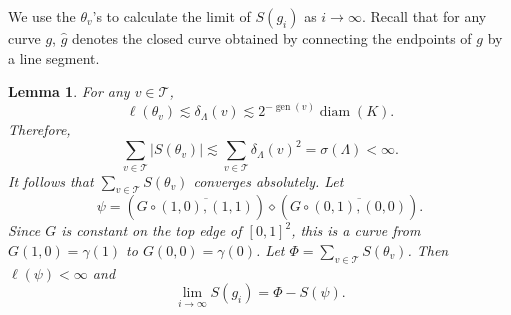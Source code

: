 \documentclass[12pt,reqno]{amsart}
\newcommand{\cT}{\mathcal{T}}
\DeclareMathOperator{\gen}{gen}
\newtheorem{lemma}[thm]{Lemma}
\theoremstyle{remark}
\newcommand{\0}{\mathbf{0}}
\renewcommand{\1}{\mathbf 1}
\DeclareMathOperator{\diam}{diam}
\begin{document}
We use the $\theta_v$'s to calculate the limit of $S(g_i)$ as $i\to \infty$. Recall that for any curve $g$, $\hat{g}$ denotes the closed curve obtained by connecting the endpoints of $g$ by a line segment.
\begin{lemma}\label{lem:sgi-converge}
  For any $v\in \cT$, 
  \begin{equation}\label{eq:ell-theta-v}
    \ell(\theta_v) \lesssim \delta_\Lambda(v) \lesssim 2^{-\gen(v)}\diam(K).
  \end{equation}
  Therefore,
  $$\sum_{v\in \cT} |S(\theta_v)| \lesssim \sum_{v\in \cT} \delta_\Lambda(v)^2 = \sigma(\Lambda)<\infty.$$
  It follows that $\sum_{v\in \cT} S(\theta_v)$ converges absolutely. Let
  \begin{equation}\label{eq:def-psi}
    \psi = (G\circ \overline{(1,0),(1,1)}) \diamond (G\circ \overline{(0,1),(0,0)}).
  \end{equation}
  Since $G$ is constant on the top edge of $[0,1]^2$, this is a curve from $G(1,0) = \gamma(1)$ to $G(0,0) = \gamma(0)$.
  Let $\Phi = \sum_{v\in \cT} S(\theta_v)$. 
  Then $\ell(\psi)<\infty$ and
  $$\lim_{i\to \infty} S(g_i) = \Phi - S(\psi).$$
\end{lemma}
\end{document}
